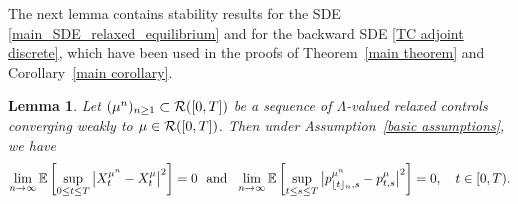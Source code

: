 \documentclass[12pt]{article}
\DeclarePairedDelimiter\floor{\lfloor}{\rfloor}
\newtheorem{lemma}[prop]{Lemma}
\theoremstyle{named}
\numberwithin{equation}{section}
\begin{document}
\noindent
The next lemma contains stability results for the SDE
\eqref{main_SDE_relaxed_equilibrium}
and for the backward SDE \eqref{TC adjoint discrete}, which have been used in
the proofs of Theorem~\ref{main theorem} and Corollary~\ref{main corollary}.
\begin{lemma}
\label{x L2 convergence proof}
 Let $( {\mu}^n )_{{n}\geq 1} \subset {\cal R}([0,T])$ be a sequence of
  $\Lambda$-valued relaxed controls converging
   weakly to ${\mu} \in {\cal R}([0,T])$.
  Then under Assumption~\ref{basic assumptions},
 we have
\begin{equation}
\nonumber
\lim\limits_{{n}\to \infty} \mathbb{E}
\left[ \sup\limits_{0 \leq t \leq T} \big| X^{{\mu}^n }_t - X^{{\mu}}_t \big|^2
  \right] = 0 \ \mbox{~and~} \
\lim\limits_{{n}\to \infty} \mathbb{E}\left[ \sup\limits_{t \leq s \leq T}
  \big| p^{{\mu}^n }_{\floor{t}_{n},s} - p^{{\mu}}_{t,s}\big|^2\right] = 0,
\quad t \in [0,T).
\end{equation}
\end{lemma}
\end{document}
